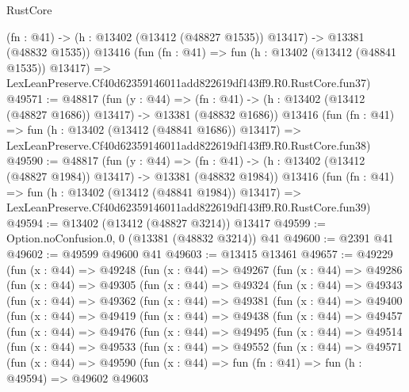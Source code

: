 \begin{lexlean}{RustCore}
\begin{coremodule}
    (fn : @41) -> (h : @13402 (@13412 (@48827 @1535)) @13417) -> @13381 (@48832 @1535))
    @13416
    (fun (fn : @41) =>
    fun (h : @13402 (@13412 (@48841 @1535)) @13417) =>
    LexLeanPreserve.Cf40d62359146011add822619df143ff9.R0.RustCore.fun37)
@49571 := @48817
    (fun (y : @44) =>
    (fn : @41) -> (h : @13402 (@13412 (@48827 @1686)) @13417) -> @13381 (@48832 @1686))
    @13416
    (fun (fn : @41) =>
    fun (h : @13402 (@13412 (@48841 @1686)) @13417) =>
    LexLeanPreserve.Cf40d62359146011add822619df143ff9.R0.RustCore.fun38)
@49590 := @48817
    (fun (y : @44) =>
    (fn : @41) -> (h : @13402 (@13412 (@48827 @1984)) @13417) -> @13381 (@48832 @1984))
    @13416
    (fun (fn : @41) =>
    fun (h : @13402 (@13412 (@48841 @1984)) @13417) =>
    LexLeanPreserve.Cf40d62359146011add822619df143ff9.R0.RustCore.fun39)
@49594 := @13402 (@13412 (@48827 @3214)) @13417
@49599 := Option.noConfusion.{0, 0} (@13381 (@48832 @3214)) @41
@49600 := @2391 @41
@49602 := @49599 @49600 @41
@49603 := @13415 @13461
@49657 := @49229
    (fun (x : @44) =>
    @49248
      (fun (x : @44) =>
      @49267
        (fun (x : @44) =>
        @49286
          (fun (x : @44) =>
          @49305
            (fun (x : @44) =>
            @49324
              (fun (x : @44) =>
              @49343
                (fun (x : @44) =>
                @49362
                  (fun (x : @44) =>
                  @49381
                    (fun (x : @44) =>
                    @49400
                      (fun (x : @44) =>
                      @49419
                        (fun (x : @44) =>
                        @49438
                          (fun (x : @44) =>
                          @49457
                            (fun (x : @44) =>
                            @49476
                              (fun (x : @44) =>
                              @49495
                                (fun (x : @44) =>
                                @49514
                                  (fun (x : @44) =>
                                  @49533
                                    (fun (x : @44) =>
                                    @49552
                                      (fun (x : @44) =>
                                      @49571
                                        (fun (x : @44) =>
                                        @49590
                                          (fun (x : @44) =>
                                          fun (fn : @41) =>
                                          fun (h : @49594) =>
                                          @49602
                                            @49603

\end{coremodule}
\end{lexlean}
